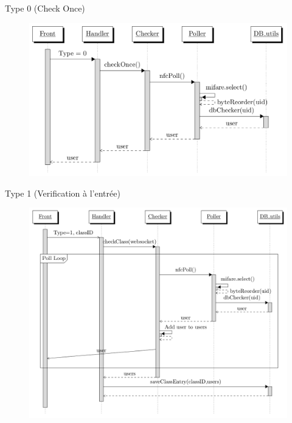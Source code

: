 \documentclass[aspectratio=169]{beamer}
\begin{document}
\begin{frame}{Type 0 (Check Once)}
    \begin{figure}[]
        \includegraphics[height=.9\textheight]{../assets/nfcSeqOnce.png}
    \end{figure}

\end{frame}

\begin{frame}{Type 1 (Verification à l'entrée)}
    \begin{figure}[]
        \includegraphics[height=.9\textheight]{../assets/nfcSeqEntry.png}
    \end{figure}

\end{frame}
\end{document}
